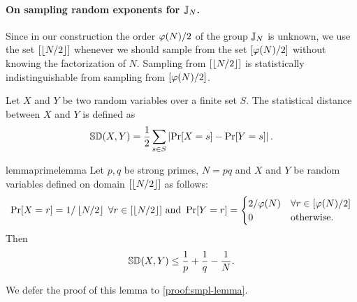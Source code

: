 \paragraph{On sampling random exponents for $\mathbb{J}_N$.}
Since in our construction the order $\varphi(N)/2$ of the group $\mathbb{J}_N$ is unknown, we use the set $[\left\lfloor N/2 \right\rfloor]$ whenever we should sample from the set $[\varphi(N)/2]$ without knowing the factorization of $N$. Sampling from $[\left\lfloor N/2 \right\rfloor]$ is statistically indistinguishable from sampling from $[\varphi(N)/2]$. 


\begin{definition}
Let $X$ and $Y$ be two random variables over a finite set $S$. The statistical distance between $X$ and $Y$ is defined as 
\[\mathbb{SD}(X, Y) = \frac{1}{2} \sum_{s \in S} \left| \Pr[X = s] - \Pr[Y = s] \right|.\]
\end{definition}


\begin{restatable}{lemma}{primelemma}\label{sampling-lemma}
Let $p,q$ be strong primes, $N=pq$ and  $X$ and $Y$ be random variables defined on domain $[\left\lfloor N/2 \right\rfloor]$ as follows:
\[
\Pr[X = r] = 1/\left\lfloor N/2 \right\rfloor \; \forall r \in [\left\lfloor N/2 \right\rfloor] \text{ and } \Pr[Y = r] = 
\begin{cases} 
     2/\varphi(N) & \forall r \in [\varphi(N)/2] \\
     0 & \text{otherwise}. 
   \end{cases}
\]
Then 
\[
\mathbb{SD}(X, Y) \leq \frac{1}{p}+\frac{1}{q}-\frac{1}{N}.
\]
\end{restatable}

We defer the proof of this lemma to \ref{proof:smpl-lemma}.




